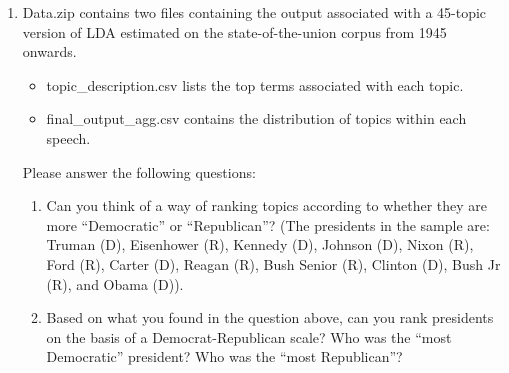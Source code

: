 \documentclass[12pt,a4paper]{article}
\begin{document}
 

\begin{enumerate}

\item Data.zip contains two files containing the output associated with a 45-topic version of LDA estimated on the state-of-the-union corpus from 1945 onwards.
\begin{itemize}
	\item topic\_description.csv lists the top terms associated with each topic.
	\item final\_output\_agg.csv contains the distribution of topics within each speech.
\end{itemize}
Please answer the following questions:
	\begin{enumerate}
	\item Can you think of a way of ranking topics according to whether they are more ``Democratic'' or ``Republican''?  (The presidents in the sample are: Truman (D), Eisenhower (R), Kennedy (D), Johnson (D), Nixon (R), Ford (R), Carter (D), Reagan (R), Bush Senior (R), Clinton (D), Bush Jr (R), and Obama (D)).
	\item Based on what you found in the question above, can you rank presidents on the basis of a Democrat-Republican scale? Who was the ``most Democratic'' president?  Who was the ``most Republican''?
	\end{enumerate}

\end{enumerate}
\end{document}
